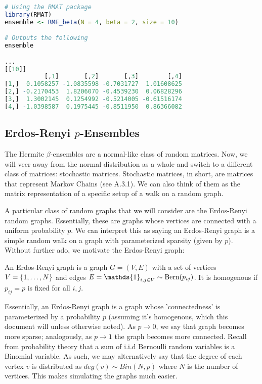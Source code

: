 \begin{lstlisting}[language=R]
# Using the RMAT package
library(RMAT)
ensemble <- RME_beta(N = 4, beta = 2, size = 10)

# Outputs the following
ensemble

...
[[10]]
           [,1]       [,2]       [,3]        [,4]
[1,]  0.1058257 -1.0835598 -0.7031727  1.01608625
[2,] -0.2170453  1.8206070 -0.4539230  0.06828296
[3,]  1.3002145  0.1254992 -0.5214005 -0.61516174
[4,] -1.0398587  0.1975445 -0.8511950  0.86366082
\end{lstlisting}

\subsection{Erdos-Renyi $p$-Ensembles}

The Hermite $\beta$-ensembles are a normal-like class of random matrices. Now, we will veer away from the normal distribution as a whole and switch to a different class of matrices: stochastic matrices. Stochastic matrices, in short, are matrices that represent Markov Chains (see A.3.1). We can also think of them as the matrix representation of a specific setup of a walk on a random graph. 

A particular class of random graphs that we will consider are the Erdos-Renyi random graphs. Essentially, these are graphs whose vertices are connected with a uniform probability $p$. We can interpret this as saying an Erdos-Renyi graph is a simple random walk on a graph with parameterized sparsity (given by $p$). Without further ado, we motivate the Erdos-Renyi graph:

\begin{definition}
An Erdos-Renyi graph is a graph $G = (V,E)$ with a set of vertices $V = \{\oneto[N]\}$ and edges $E = \mathds{1}_{i,j \in V} \sim \Bern(p_{ij})$. It is homogenous if $p_{ij} = p$ is fixed for all $i, j$.
\end{definition}

Essentially, an Erdos-Renyi graph is a graph whose 'connectedness' is parameterized by a probability $p$ (assuming it's homogenous, which this document will unless otherwise noted). As $p \to 0$, we say that graph becomes more sparse; analogously, as $p \to 1$ the graph becomes more connected.\newline
\indent Recall from probability theory that a sum of i.i.d Bernoulli random variables is a Binomial variable. As such, we may alternatively say that the degree of each vertex $v$ is distributed as $deg(v) \sim Bin(N,p)$ where $N$ is the number of vertices. This makes simulating the graphs much easier.

